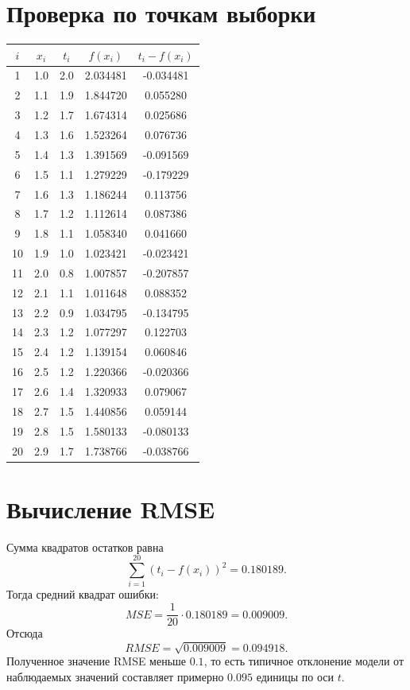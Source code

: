 \documentclass[12pt,a4paper]{article}
\begin{document}
\section*{Проверка по точкам выборки}
\begin{center}
\small
\begin{tabular}{ccccc}
\toprule
$i$ & $x_i$ & $t_i$ & $f(x_i)$ & $t_i-f(x_i)$ \\
\midrule
1  & 1.0 & 2.0 & 2.034481 & -0.034481 \\
2  & 1.1 & 1.9 & 1.844720 & 0.055280 \\
3  & 1.2 & 1.7 & 1.674314 & 0.025686 \\
4  & 1.3 & 1.6 & 1.523264 & 0.076736 \\
5  & 1.4 & 1.3 & 1.391569 & -0.091569 \\
6  & 1.5 & 1.1 & 1.279229 & -0.179229 \\
7  & 1.6 & 1.3 & 1.186244 & 0.113756 \\
8  & 1.7 & 1.2 & 1.112614 & 0.087386 \\
9  & 1.8 & 1.1 & 1.058340 & 0.041660 \\
10 & 1.9 & 1.0 & 1.023421 & -0.023421 \\
11 & 2.0 & 0.8 & 1.007857 & -0.207857 \\
12 & 2.1 & 1.1 & 1.011648 & 0.088352 \\
13 & 2.2 & 0.9 & 1.034795 & -0.134795 \\
14 & 2.3 & 1.2 & 1.077297 & 0.122703 \\
15 & 2.4 & 1.2 & 1.139154 & 0.060846 \\
16 & 2.5 & 1.2 & 1.220366 & -0.020366 \\
17 & 2.6 & 1.4 & 1.320933 & 0.079067 \\
18 & 2.7 & 1.5 & 1.440856 & 0.059144 \\
19 & 2.8 & 1.5 & 1.580133 & -0.080133 \\
20 & 2.9 & 1.7 & 1.738766 & -0.038766 \\
\bottomrule
\end{tabular}
\normalsize
\end{center}

\section*{Вычисление RMSE}
Сумма квадратов остатков равна
\[
    \sum_{i=1}^{20}\left(t_i-f(x_i)\right)^2 = 0.180189.
\]
Тогда средний квадрат ошибки:
\[
    MSE=\frac{1}{20}\cdot 0.180189=0.009009.
\]
Отсюда
\[
\boxed{
    RMSE=\sqrt{0.009009}=0.094918
}.
\]
Полученное значение RMSE меньше $0.1$, то есть типичное отклонение модели от
наблюдаемых значений составляет примерно $0.095$ единицы по оси $t$.
\end{document}

